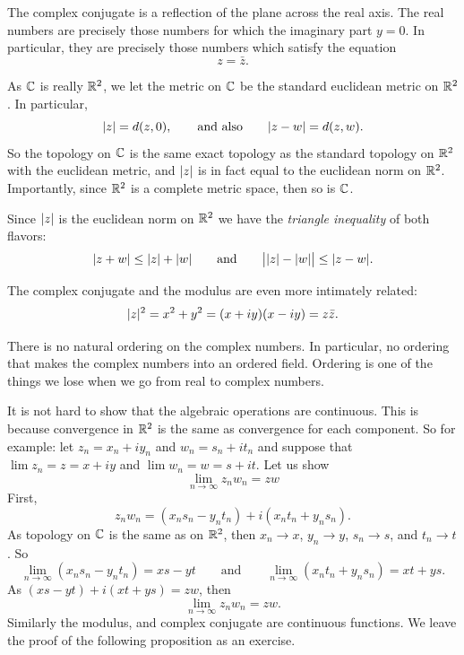 The complex conjugate is a reflection of the plane across the real axis.
The real numbers are precisely those numbers for which the imaginary
part $y=0$.  In particular, they are precisely those numbers which satisfy
the equation
\begin{equation*}
z = \bar{z} .
\end{equation*}

As ${\mathbb{C}}$ is really ${\mathbb{R}}^2$, we let the metric on ${\mathbb{C}}$ be the standard
euclidean metric on ${\mathbb{R}}^2$.
In particular,
\begin{equation*}
\lvert {z} \rvert = d(z,0) , \qquad 
\text{and also} \qquad 
\lvert {z-w} \rvert = d(z,w) .
\end{equation*}
So the topology on ${\mathbb{C}}$ is
the same exact topology as the standard topology on ${\mathbb{R}}^2$
with the euclidean metric,
and $\lvert {z} \rvert$ is in fact equal to the euclidean norm on ${\mathbb{R}}^2$.
Importantly, since ${\mathbb{R}}^2$ is a complete metric space, then
so is ${\mathbb{C}}$.

Since $\lvert {z} \rvert$ is the euclidean norm on ${\mathbb{R}}^2$ we have the
\emph{triangle inequality}
of both flavors:
\begin{equation*}
\lvert {z+w} \rvert \leq \lvert {z} \rvert+\lvert {w} \rvert \qquad \text{and} \qquad
\big\lvert \lvert {z} \rvert-\lvert {w} \rvert \big\rvert \leq \lvert {z-w} \rvert .
\end{equation*}

The complex conjugate and the modulus are even more intimately related:
\begin{equation*}
\lvert {z} \rvert^2 =
x^2+y^2 =
(x+iy)(x-iy) =
z \bar{z} .
\end{equation*}

\begin{remark}
There is no natural ordering on the complex numbers.
In particular,
no ordering that makes the complex numbers into an ordered field.
Ordering is one of the things we lose when we go from real to complex
numbers.
\end{remark}

It is not hard to show that the algebraic operations are
continuous.  This is because convergence in 
${\mathbb{R}}^2$ is the same as convergence for each component.  So for example:
let $z_n = x_n + iy_n$ and
$w_n = s_n + it_n$ and suppose that
$\lim z_n = z = x+iy$ and $\lim w_n = w = s+it$.
Let us show
\begin{equation*}
\lim_{n\to\infty} z_n w_n = zw
\end{equation*}
First,
\begin{equation*}
z_n w_n = (x_ns_n-y_nt_n) + i(x_nt_n+y_ns_n) .
\end{equation*}
As topology on ${\mathbb{C}}$ is the same as on ${\mathbb{R}}^2$, then
$x_n \to x$, $y_n \to y$, $s_n \to s$, and $t_n \to t$.
So
\begin{equation*}
\lim_{n\to\infty} (x_ns_n-y_nt_n) = xs-yt \qquad \text{and} \qquad
\lim_{n\to\infty} (x_nt_n+y_ns_n) = xt+ys .
\end{equation*}
As
$(xs-yt)+i(xt+ys) = zw$, then
\begin{equation*}
\lim_{n\to\infty} z_n w_n = zw .
\end{equation*}
Similarly the modulus, and complex conjugate are continuous functions.  We
leave the proof of the following proposition as an exercise.

